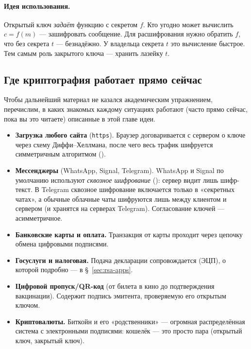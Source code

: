 \paragraph*{Идея использования.} Открытый ключ \emph{задаёт} функцию с секретом $f$. Кто угодно может вычислить $c = f(m)$ --- зашифровать сообщение. Для расшифрования нужно обратить $f$, что без секрета $t$ --- безнадёжно. У владельца секрета $t$ это вычисление быстрое. Тем самым роль закрытого ключа --- хранить лазейку $t$.

\subsection{Где криптография работает прямо сейчас}

Чтобы дальнейший материал не казался академическим упражнением, перечислим, в каких знакомых каждому ситуациях работают (часто прямо сейчас, пока вы это читаете) описанные в этой главе идеи.

\begin{itemize}
  \item \textbf{Загрузка любого сайта} (\texttt{https}). Браузер договаривается с сервером о ключе через схему Диффи--Хеллмана, после чего весь трафик шифруется симметричным алгоритмом ().
  \item \textbf{Мессенджеры} (WhatsApp, Signal, Telegram). WhatsApp и Signal по умолчанию используют \emph{сквозное шифрование} (): сервер видит лишь шифр-текст. В Telegram сквозное шифрование включается только в «секретных чатах», а обычные облачные чаты шифруются лишь между клиентом и сервером (и хранятся на серверах Telegram). Согласование ключей --- асимметричное.
  \item \textbf{Банковские карты и оплата.} Транзакция от карты проходит через цепочку обмена цифровыми подписями.
  \item \textbf{Госуслуги и налоговая.} Подача декларации сопровождается  (ЭЦП), о которой подробно --- в §~\ref{sec:rsa-apps}.
  \item \textbf{Цифровой пропуск/QR-код} (от билета в кино до подтверждения вакцинации). Содержит подпись эмитента, проверяемую его открытым ключом.
  \item \textbf{Криптовалюты.} Биткойн и его «родственники» --- огромная распределённая система с электронными подписями: кошелёк --- это просто пара (открытый ключ, закрытый ключ).
\end{itemize}

